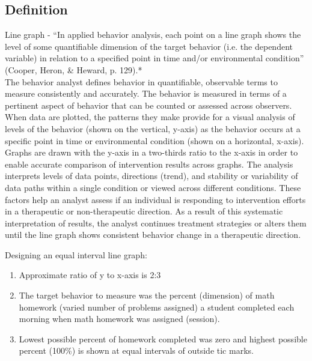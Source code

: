 \subsection{Definition}
Line graph - ``In applied behavior analysis, each point on a line graph shows the level of some quantifiable dimension of the target behavior (i.e. the dependent variable) in relation to a specified point in time and/or environmental condition'' (Cooper, Heron, \& Heward, p. 129).*\\

The behavior analyst defines behavior in quantifiable, observable terms to measure consistently and accurately. The behavior is measured in terms of a pertinent aspect of behavior that can be counted or assessed across observers. When data are plotted, the patterns they make provide for a visual analysis of levels of the behavior (shown on the vertical, y-axis) as the behavior occurs at a specific point in time or environmental condition (shown on a horizontal, x-axis). Graphs are drawn with the y-axis in a two-thirds ratio to the x-axis in order to enable accurate comparison of intervention results across graphs. The analysis interprets levels of data points, directions (trend), and stability or variability of data paths within a single condition or viewed across different conditions. These factors help an analyst assess if an individual is responding to intervention efforts in a therapeutic or non-therapeutic direction. As a result of this systematic interpretation of results, the analyst continues treatment strategies or alters them until the line graph shows consistent behavior change in a therapeutic direction.

Designing an equal interval line graph:
\begin{enumerate}
\item Approximate ratio of y to x-axis is 2:3
\item The target behavior to measure was the percent (dimension) of math homework (varied number of problems assigned) a student completed each morning when math homework was assigned (session).
\item Lowest possible percent of homework completed was zero and highest possible percent (100\%) is shown at equal intervals of outside tic marks.
\end{enumerate}

